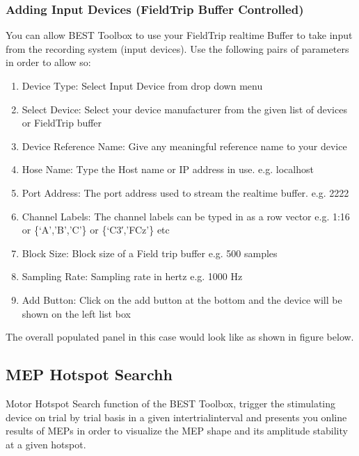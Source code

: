 \documentclass[letterpaper,10pt,english]{sphinxmanual}
\begin{document}
\subsubsection{Adding Input Devices (FieldTrip Buffer Controlled)}
\label{\detokenize{5_HardwareConfiguration:adding-input-devices-fieldtrip-buffer-controlled}}
\sphinxAtStartPar
You can allow BEST Toolbox to use your FieldTrip real\sphinxhyphen{}time Buffer to take input from the recording system (input devices). Use the following pairs of parameters in order to allow so:
\begin{enumerate}
%
\item {} 
\sphinxAtStartPar
Device Type: Select Input Device from drop down menu

\item {} 
\sphinxAtStartPar
Select Device: Select your device manufacturer from the given list of devices or FieldTrip buffer

\item {} 
\sphinxAtStartPar
Device Reference Name: Give any meaningful reference name to your device

\item {} 
\sphinxAtStartPar
Hose Name: Type the Host name or IP address in use. e.g. localhost

\item {} 
\sphinxAtStartPar
Port Address: The port address used to stream the real\sphinxhyphen{}time buffer. e.g. 2222

\item {} 
\sphinxAtStartPar
Channel Labels: The channel labels can be typed in as a row vector e.g. 1:16 or \{‘A’,’B’,’C’\} or \{‘C3′,’FCz’\} etc

\item {} 
\sphinxAtStartPar
Block Size: Block size of a Field trip buffer e.g. 500 samples

\item {} 
\sphinxAtStartPar
Sampling Rate: Sampling rate in hertz e.g. 1000 Hz

\item {} 
\sphinxAtStartPar
Add Button: Click on the add button at the bottom and the device will be shown on the left list box

\end{enumerate}

\sphinxAtStartPar
The overall populated panel in this case would look like as shown in figure below.


\subsection{MEP Hotspot Searchh}
\label{\detokenize{6_MEPHotspotSearch:mep-hotspot-searchh}}\label{\detokenize{6_MEPHotspotSearch::doc}}
\sphinxAtStartPar
Motor Hotspot Search function of the BEST Toolbox, trigger the stimulating device on trial by trial basis in a given inter\sphinxhyphen{}trial\sphinxhyphen{}interval and presents you online results of MEPs in order to visualize the MEP shape and its amplitude stability at a given hotspot.
\end{document}
